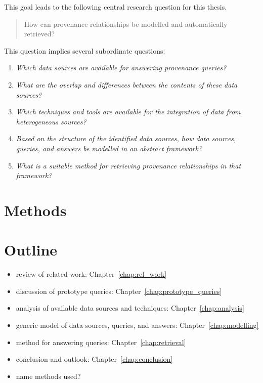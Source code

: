This goal leads to the following
central research question for this thesis.
%
\begin{quote}
  \begin{itshape}
    How can provenance relationships be modelled and automatically retrieved?
  \end{itshape}
\end{quote}
%  
This question implies several subordinate questions:
%
\begin{enumerate}
  \item[\subquestion{1}]
    \emph{Which data sources are available for answering provenance queries?}
  \item[\subquestion{2}]
    \emph{What are the overlap and differences between the contents of these data sources?}
  \item[\subquestion{3}]
    \emph{Which techniques and tools are available for the integration
    of data from heterogeneous sources?}
  \item[\subquestion{4}]
    \emph{Based on the structure of the identified data sources,
    how data sources, queries, and answers be modelled in an abstract framework?}
  \item[\subquestion{5}]
    \emph{What is a suitable method for retrieving provenance relationships
    in that framework?}
\end{enumerate}


\section{Methods}
\label{sec:methods}



\section{Outline}
\label{sec:outline}

\begin{itemize}
  \item
    review of related work: Chapter~\ref{chap:rel_work}
  \item
    discussion of prototype queries: Chapter~\ref{chap:prototype_queries}
  \item
    analysis of available data sources and techniques: Chapter~\ref{chap:analysis}
  \item
    generic model of data sources, queries, and answers: Chapter~\ref{chap:modelling}
  \item
    method for answering queries: Chapter~\ref{chap:retrieval}
  \item
    conclusion and outlook: Chapter~\ref{chap:conclusion}
  \item
    name methods used?
\end{itemize}


